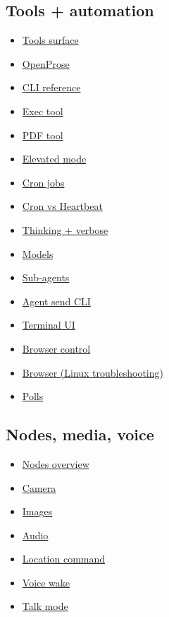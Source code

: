 \subsection{Tools + automation}


\begin{itemize}
  \item \href{/tools}{Tools surface}
  \item \href{/prose}{OpenProse}
  \item \href{/cli}{CLI reference}
  \item \href{/tools/exec}{Exec tool}
  \item \href{/tools/pdf}{PDF tool}
  \item \href{/tools/elevated}{Elevated mode}
  \item \href{/automation/cron-jobs}{Cron jobs}
  \item \href{/automation/cron-vs-heartbeat}{Cron vs Heartbeat}
  \item \href{/tools/thinking}{Thinking + verbose}
  \item \href{/concepts/models}{Models}
  \item \href{/tools/subagents}{Sub-agents}
  \item \href{/tools/agent-send}{Agent send CLI}
  \item \href{/web/tui}{Terminal UI}
  \item \href{/tools/browser}{Browser control}
  \item \href{/tools/browser-linux-troubleshooting}{Browser (Linux troubleshooting)}
  \item \href{/automation/poll}{Polls}
\end{itemize}


\subsection{Nodes, media, voice}


\begin{itemize}
  \item \href{/nodes}{Nodes overview}
  \item \href{/nodes/camera}{Camera}
  \item \href{/nodes/images}{Images}
  \item \href{/nodes/audio}{Audio}
  \item \href{/nodes/location-command}{Location command}
  \item \href{/nodes/voicewake}{Voice wake}
  \item \href{/nodes/talk}{Talk mode}
\end{itemize}


